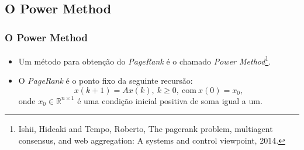 \documentclass{beamer}
\begin{document}
\begin{frame}
	\subsection{O Power Method}
	\frametitle{O Power Method}
	
\begin{itemize}

\item Um m\'etodo para obten\c{c}\~ao do \textit{PageRank} \'e o chamado \textit{Power Method}\footnote{\tiny \justifying Ishii, Hideaki and Tempo, Roberto, The pagerank problem, multiagent consensus, and web aggregation: A systems and control viewpoint, 2014.}.
		
\vspace{0.5cm}

\item O \textit{PageRank} é o ponto fixo da seguinte recursão:
%
\begin{equation}
	x(k+1) = Ax(k),\: k\geq0,\: \text{com} \: x(0) = x_0,
\end{equation}
%
onde $x_0 \in \mathbb{R}^{n \times 1}$ \'e uma condi\c{c}\~ao inicial positiva de soma igual a um.

\end{itemize}
	
\end{frame}
\end{document}
